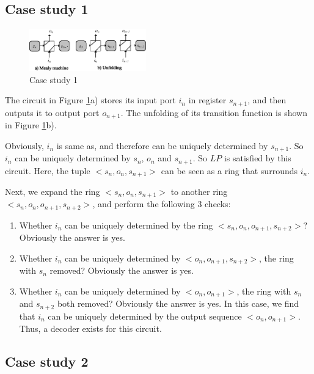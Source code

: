 \documentclass[journal]{IEEEtran}
\begin{document}
\subsection{Case study 1}\label{subsec_case1}

\begin{figure}[b]
\begin{center}
\includegraphics[width=0.45\textwidth]{c1}
\end{center}
\caption{Case study 1}
  \label{fig_case1}
\end{figure}

The circuit in Figure \ref{fig_case1}a) stores its input port $i_n$ in register $s_{n+1}$,
and then outputs it to output port $o_{n+1}$.
The unfolding of its transition function is shown in Figure \ref{fig_case1}b).

Obviously,
$i_n$ is same as,
and therefore can be uniquely determined by $s_{n+1}$.
So $i_n$ can be uniquely determined by $s_n$, $o_n$ and $s_{n+1}$.
So $LP$ is satisfied by this circuit.
Here,
the tuple $<s_n, o_n, s_{n+1}>$ can be seen as a ring that surrounds $i_n$.

Next,
we expand the ring $<s_n, o_n, s_{n+1}>$ to another ring $<s_n, o_n, o_{n+1}, s_{n+2}>$,
and perform the following 3 checks:
\begin{enumerate}
\item Whether $i_n$ can be uniquely determined by the ring $<s_n, o_n, o_{n+1}, s_{n+2}>$?
Obviously the answer is yes.
\item Whether $i_n$ can be uniquely determined by $<o_n, o_{n+1}, s_{n+2}>$, the ring with $s_n$ removed?
Obviously the answer is yes.
\item Whether $i_n$ can be uniquely determined by $<o_n, o_{n+1}>$, the ring with $s_n$ and $s_{n+2}$ both removed?
Obviously the answer is yes.
In this case,
we find that $i_n$ can be uniquely determined by the output sequence $<o_n, o_{n+1}>$.
Thus,
a decoder exists for this circuit.
\end{enumerate}

\subsection{Case study 2}\label{subsec_case2}
\end{document}
